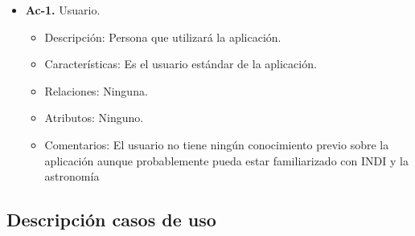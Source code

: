 \begin{itemize}
  \item \textbf{Ac-1.} Usuario.
  \begin{itemize}
   \item Descripción: Persona que utilizará la aplicación.
   \item Características: Es el usuario estándar de la aplicación.
   \item Relaciones: Ninguna.
   \item Atributos: Ninguno.
   \item Comentarios: El usuario no tiene ningún conocimiento previo sobre la aplicación aunque probablemente pueda estar familiarizado con INDI y la astronomía
  \end{itemize}
\end{itemize}

\subsection{Descripción casos de uso}

